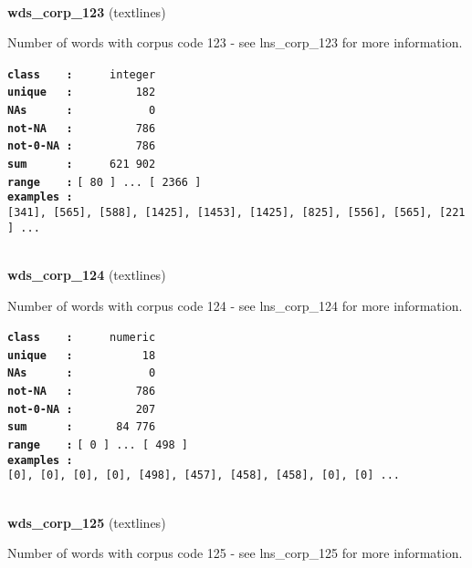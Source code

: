 \documentclass[]{article}
\begin{document}
~

\textbf{wds\_corp\_123} (textlines)

Number of words with corpus code 123 - see lns\_corp\_123 for more
information.

\textbf{\texttt{class\ \ \ \ :}} \texttt{~~~~~integer}\\
\textbf{\texttt{unique\ \ \ :}} \texttt{~~~~~~~~~182}\\
\textbf{\texttt{NAs\ \ \ \ \ \ :}} \texttt{~~~~~~~~~~~0}\\
\textbf{\texttt{not-NA\ \ \ :}} \texttt{~~~~~~~~~786}\\
\textbf{\texttt{not-0-NA\ :}} \texttt{~~~~~~~~~786}\\
\textbf{\texttt{sum\ \ \ \ \ \ :}} \texttt{~~~~~621~902}\\
\textbf{\texttt{range\ \ \ \ :}}
\texttt{{[}\ 80\ {]}\ ...\ {[}\ 2366\ {]}}\\
\textbf{\texttt{examples\ :}}
\texttt{{[}341{]},\ {[}565{]},\ {[}588{]},\ {[}1425{]},\ {[}1453{]},\ {[}1425{]},\ {[}825{]},\ {[}556{]},\ {[}565{]},\ {[}221{]}\ ...}\\

~

\textbf{wds\_corp\_124} (textlines)

Number of words with corpus code 124 - see lns\_corp\_124 for more
information.

\textbf{\texttt{class\ \ \ \ :}} \texttt{~~~~~numeric}\\
\textbf{\texttt{unique\ \ \ :}} \texttt{~~~~~~~~~~18}\\
\textbf{\texttt{NAs\ \ \ \ \ \ :}} \texttt{~~~~~~~~~~~0}\\
\textbf{\texttt{not-NA\ \ \ :}} \texttt{~~~~~~~~~786}\\
\textbf{\texttt{not-0-NA\ :}} \texttt{~~~~~~~~~207}\\
\textbf{\texttt{sum\ \ \ \ \ \ :}} \texttt{~~~~~~84~776}\\
\textbf{\texttt{range\ \ \ \ :}}
\texttt{{[}\ 0\ {]}\ ...\ {[}\ 498\ {]}}\\
\textbf{\texttt{examples\ :}}
\texttt{{[}0{]},\ {[}0{]},\ {[}0{]},\ {[}0{]},\ {[}498{]},\ {[}457{]},\ {[}458{]},\ {[}458{]},\ {[}0{]},\ {[}0{]}\ ...}\\

~

\textbf{wds\_corp\_125} (textlines)

Number of words with corpus code 125 - see lns\_corp\_125 for more
information.
\end{document}
